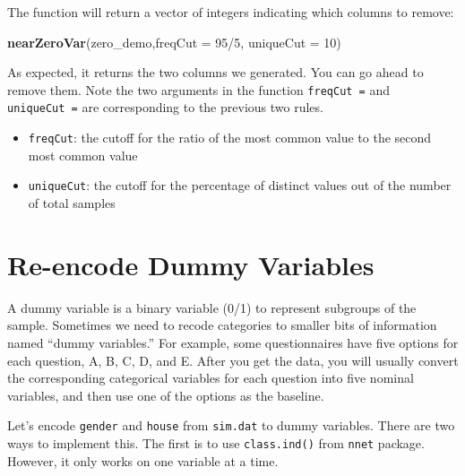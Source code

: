 \documentclass[12pt,]{krantz}
\newenvironment{Shaded}{\begin{snugshade}}{\end{snugshade}}
\newcommand{\KeywordTok}[1]{\textcolor[rgb]{0.13,0.29,0.53}{\textbf{{#1}}}}
\newcommand{\DataTypeTok}[1]{\textcolor[rgb]{0.13,0.29,0.53}{{#1}}}
\newcommand{\DecValTok}[1]{\textcolor[rgb]{0.00,0.00,0.81}{{#1}}}
\newcommand{\NormalTok}[1]{{#1}}
\providecommand{\tightlist}{%
  \setlength{\itemsep}{0pt}\setlength{\parskip}{0pt}}
\theoremstyle{definition}
\theoremstyle{definition}
\theoremstyle{remark}
\begin{document}
The function will return a vector of integers indicating which columns
to remove:

\begin{Shaded}
\begin{Highlighting}[]
\KeywordTok{nearZeroVar}\NormalTok{(zero_demo,}\DataTypeTok{freqCut =} \DecValTok{95}\NormalTok{/}\DecValTok{5}\NormalTok{, }\DataTypeTok{uniqueCut =} \DecValTok{10}\NormalTok{)}
\end{Highlighting}
\end{Shaded}

As expected, it returns the two columns we generated. You can go ahead
to remove them. Note the two arguments in the function
\texttt{freqCut\ =} and \texttt{uniqueCut\ =} are corresponding to the
previous two rules.

\begin{itemize}
\tightlist
\item
  \texttt{freqCut}: the cutoff for the ratio of the most common value to
  the second most common value
\item
  \texttt{uniqueCut}: the cutoff for the percentage of distinct values
  out of the number of total samples
\end{itemize}

\section{Re-encode Dummy Variables}\label{re-encode-dummy-variables}

A dummy variable is a binary variable (0/1) to represent subgroups of
the sample. Sometimes we need to recode categories to smaller bits of
information named ``dummy variables.'' For example, some questionnaires
have five options for each question, A, B, C, D, and E. After you get
the data, you will usually convert the corresponding categorical
variables for each question into five nominal variables, and then use
one of the options as the baseline.

Let's encode \texttt{gender} and \texttt{house} from \texttt{sim.dat} to
dummy variables. There are two ways to implement this. The first is to
use \texttt{class.ind()} from \texttt{nnet} package. However, it only
works on one variable at a time.

\begin{Shaded}
\end{Shaded}
\end{document}
